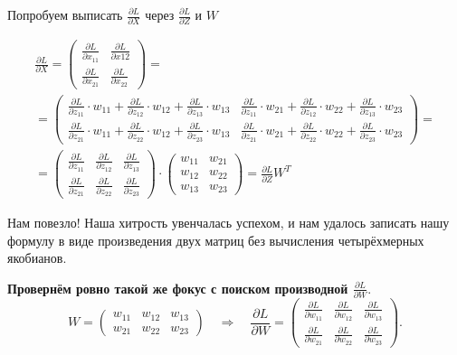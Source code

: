\begin{sol}
Попробуем выписать $\frac{\partial L}{\partial X}$ через $\frac{\partial L}{\partial Z}$ и $W$

\begin{multline*}
\frac{\partial L}{\partial X} = \begin{pmatrix} \frac{\partial L}{\partial x_{11}}  & \frac{\partial L}{\partial x{12}} \\ \frac{\partial L}{\partial x_{21}}  & \frac{\partial L}{\partial x_{22}}   \end{pmatrix} = \\ = \begin{pmatrix} \frac{\partial L}{\partial z_{11}} \cdot w_{11} + \frac{\partial L}{\partial z_{12}} \cdot w_{12} +  \frac{\partial L}{\partial z_{13}} \cdot w_{13}  &  \frac{\partial L}{\partial z_{11}} \cdot w_{21} + \frac{\partial L}{\partial z_{12}} \cdot w_{22} +  \frac{\partial L}{\partial z_{13}} \cdot w_{23} \\ \frac{\partial L}{\partial z_{21}} \cdot w_{11} + \frac{\partial L}{\partial z_{22}} \cdot w_{12} +  \frac{\partial L}{\partial z_{23}} \cdot w_{13}  &   \frac{\partial L}{\partial z_{21}} \cdot w_{21} + \frac{\partial L}{\partial z_{22}} \cdot w_{22} +  \frac{\partial L}{\partial z_{23}} \cdot w_{23}\end{pmatrix} = \\ = \begin{pmatrix} \frac{\partial L}{\partial z_{11}}  & \frac{\partial L}{\partial z_{12}} & \frac{\partial L}{\partial z_{13}} \\ \frac{\partial L}{\partial z_{21}}  & \frac{\partial L}{\partial z_{22}} & \frac{\partial L}{\partial z_{23}}  \end{pmatrix} \cdot \begin{pmatrix} w_{11} & w_{21} \\ w_{12} & w_{22} \\ w_{13} & w_{23} \end{pmatrix} = \frac{\partial L}{\partial Z} W^T
\end{multline*}

Нам повезло! Наша хитрость увенчалась успехом, и нам удалось записать нашу формулу в виде произведения двух матриц без вычисления четырёхмерных якобианов.

\textbf{Провернём ровно такой же фокус с поиском производной $\frac{\partial L}{\partial W}.$}
\[ 
    W = \begin{pmatrix} w_{11} & w_{12} & w_{13} \\  w_{21} & w_{22} & w_{23}  \end{pmatrix} \quad \Rightarrow \quad  \frac{\partial L}{\partial W} = \begin{pmatrix} \frac{\partial L}{\partial w_{11}}  & \frac{\partial L}{\partial w_{12}} & \frac{\partial L}{\partial w_{13}} \\ \frac{\partial L}{\partial w_{21}}  & \frac{\partial L}{\partial w_{22}}  & \frac{\partial L}{\partial w_{23}}  \end{pmatrix}.
\]


\end{sol}

